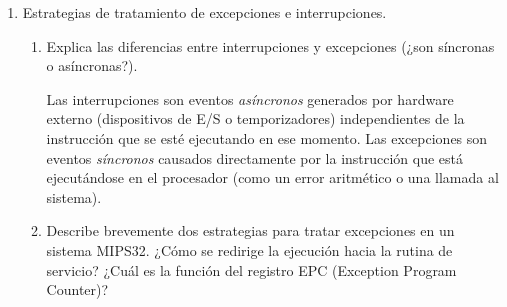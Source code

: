 \documentclass[12pt,a4paper]{article}
\begin{document}
\begin{enumerate}[label=\arabic*.]
    \begin{enumerate}[label=\alph*)]
        \item Enumera al menos 4 situaciones en las que se pueda generar una excepción (por ejemplo: desbordamiento aritmético, fallo de dirección, etc.).
        
        \vspace{0.3cm}
        . Desbordamiento aritmético (Overflow en operaciones con signo). \\
        2. Instrucción ilegal o no válida. \\
        3. Fallo de dirección de memoria por alineación incorrecta (Address Error). \\
        4. Llamada al sistema (Syscall) o punto de interrupción (Breakpoint).

        \item Explica qué etapas del pipeline pueden provocar una excepción y por qué.
        
        \vspace{0.3cm}
        \noindent
        Las excepciones pueden originarse en distintas etapas: la etapa de \textit{Búsqueda (Fetch)} e \textit{Instrucción (Decode)} pueden generar excepciones por direcciones de memoria inválidas o instrucciones no reconocidas. La etapa de \textit{Ejecución (Execute)} es la principal fuente de excepciones internas, como desbordamientos aritméticos o divisiones entre cero.
    \end{enumerate}

    \item Estrategias de tratamiento de excepciones e interrupciones.
    
    \begin{enumerate}[label=\alph*)]
        \item Explica las diferencias entre interrupciones y excepciones (¿son síncronas o asíncronas?).
        
        \vspace{0.3cm}
        \noindent
        Las interrupciones son eventos \textit{asíncronos} generados por hardware externo (dispositivos de E/S o temporizadores) independientes de la instrucción que se esté ejecutando en ese momento. Las excepciones son eventos \textit{síncronos} causados directamente por la instrucción que está ejecutándose en el procesador (como un error aritmético o una llamada al sistema).

        \item Describe brevemente dos estrategias para tratar excepciones en un sistema MIPS32. ¿Cómo se redirige la ejecución hacia la rutina de servicio? ¿Cuál es la función del registro EPC (Exception Program Counter)?
        

\end{enumerate}
\end{enumerate}
\end{document}
